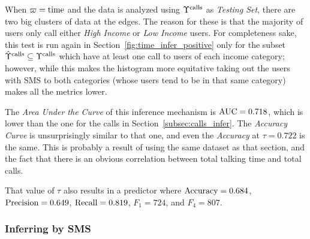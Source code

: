 When $\varpi = \operatorname{time}$ and the data is analyzed using $\Upsilon^{\operatorname{calls}}$ as \emph{Testing Set}, there are two big clusters of data at the edges. The reason for these is that the majority of users only call either \emph{High Income} or \emph{Low Income} users. For completeness sake, this test is run again in Section~\ref{fig:time_infer_positive} only for the subset $\hat{\Upsilon}^{\operatorname{calls}} \subseteq \Upsilon^{\operatorname{calls}}$ which have at least one call to users of each income category; however, while this makes the histogram more equitative taking out the users with SMS to both categories (whose users tend to be in that same category) makes all the metrics lower.

The \emph{Area Under the Curve} of this inference mechanism is $\operatorname{AUC} = 0.718$, which is lower than the one for the calls in Section~\ref{subsec:calls_infer}. The \emph{Accuracy Curve} is unsurprisingly similar to that one, and even the \emph{Accuracy} at $\tau = 0.722$ is the same. This is probably a result of using the same dataset as that section, and the fact that there is an obvious correlation between total talking time and total calls.

That value of $\tau$ also results in a predictor where $\operatorname{Accuracy} = 0.684$, $\operatorname{Precision} = 0.649$, $\operatorname{Recall} = 0.819$, $F_1 = 724$, and $F_4 = 807$.

\subsubsection{Inferring by SMS}
\label{subsec:sms_infer}

